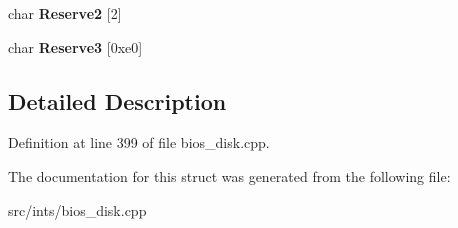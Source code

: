 \begin{DoxyCompactItemize}
\item 
\hypertarget{structNHD__FILE__HEAD_a52453e263173df250e050ed0d5934601}{char {\bfseries Reserve2} \mbox{[}2\mbox{]}}\label{structNHD__FILE__HEAD_a52453e263173df250e050ed0d5934601}

\item 
\hypertarget{structNHD__FILE__HEAD_a18b155dc7152421bb887c3ccc51b9a41}{char {\bfseries Reserve3} \mbox{[}0xe0\mbox{]}}\label{structNHD__FILE__HEAD_a18b155dc7152421bb887c3ccc51b9a41}

\end{DoxyCompactItemize}


\subsection{Detailed Description}


Definition at line 399 of file bios\-\_\-disk.\-cpp.



The documentation for this struct was generated from the following file\-:\begin{DoxyCompactItemize}
\item 
src/ints/bios\-\_\-disk.\-cpp\end{DoxyCompactItemize}
